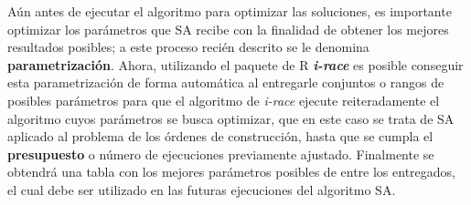 Aún antes de ejecutar el algoritmo para optimizar las soluciones, es importante optimizar los parámetros que SA recibe con la finalidad de obtener los mejores resultados posibles; a este proceso recién descrito se le denomina \textbf{parametrización}. Ahora, utilizando el paquete de R \textit{\textbf{i-race}} es posible conseguir esta parametrización de forma automática al entregarle conjuntos o rangos de posibles parámetros para que el algoritmo de \textit{i-race} ejecute reiteradamente el algoritmo cuyos parámetros se busca optimizar, que en este caso se trata de SA aplicado al problema de los órdenes de construcción, hasta que se cumpla el \textbf{presupuesto} o número de ejecuciones previamente ajustado. Finalmente se obtendrá una tabla con los mejores parámetros posibles de entre los entregados, el cual debe ser utilizado en las futuras ejecuciones del algoritmo SA.